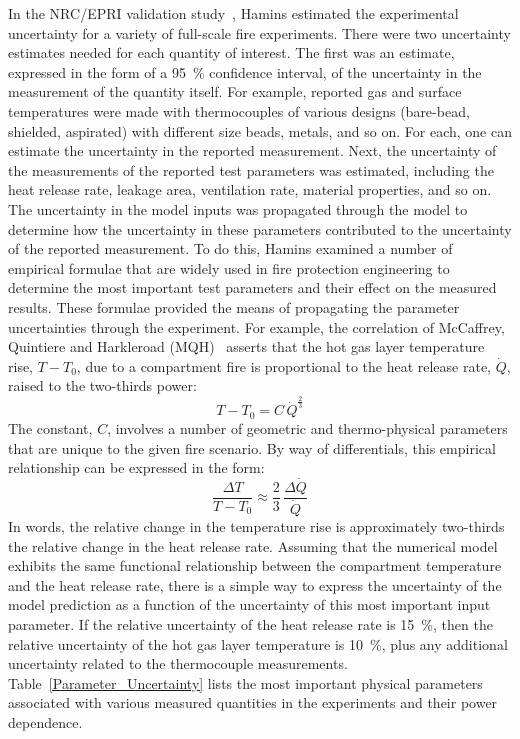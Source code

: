 \documentclass[fleqn,b5paper]{article}
\begin{document}
In the NRC/EPRI validation study~\cite{NUREG_1824}, Hamins estimated the experimental uncertainty for a variety of full-scale fire experiments. There were two uncertainty estimates needed for each quantity of interest. The first was an estimate, expressed in the form of a 95~\% confidence interval, of the uncertainty in the measurement of the quantity itself. For example, reported gas and surface temperatures were made with thermocouples of various designs (bare-bead, shielded, aspirated) with different size beads, metals, and so on. For each, one can estimate the uncertainty in the reported measurement. Next, the uncertainty of the measurements of the reported test parameters was estimated, including the heat release rate, leakage area, ventilation rate, material properties, and so on. The uncertainty in the model inputs was propagated through the model to determine how the uncertainty in these parameters contributed to the uncertainty of the reported measurement. To do this, Hamins examined a number of empirical formulae that are widely used in fire protection engineering to determine the most important test parameters and their effect on the measured results. These formulae provided the means of propagating the parameter uncertainties through the experiment. For example, the correlation of McCaffrey, Quintiere and Harkleroad (MQH)~\cite{SFPE:Walton} asserts that the hot gas layer temperature rise, $T-T_0$, due to a compartment fire is proportional to the heat release rate, $\dot{Q}$, raised to the two-thirds power:
\begin{equation}
   T-T_0 = C \, \dot{Q}^{\frac{2}{3}}
\end{equation}
The constant, $C$, involves a number of geometric and thermo-physical parameters that are unique to the given fire scenario. By way of differentials, this empirical relationship can be expressed in the form:
\begin{equation}
   \frac{\Delta T}{T-T_0} \approx \frac{2}{3} \, \frac{\Delta \dot{Q}}{\dot{Q}}
\end{equation}
In words, the relative change in the temperature rise is approximately two-thirds the relative change in the heat release rate. Assuming that the numerical model exhibits the same functional relationship between the compartment temperature and the heat release rate, there is a simple way to express the uncertainty of the model prediction as a function of the uncertainty of this most important input parameter. If the relative uncertainty of the heat release rate is 15~\%, then the relative uncertainty of the hot gas layer temperature is 10~\%, plus any additional uncertainty related to the thermocouple measurements. Table~\ref{Parameter_Uncertainty} lists the most important physical parameters associated with various measured quantities in the experiments and their power dependence.
\end{document}
